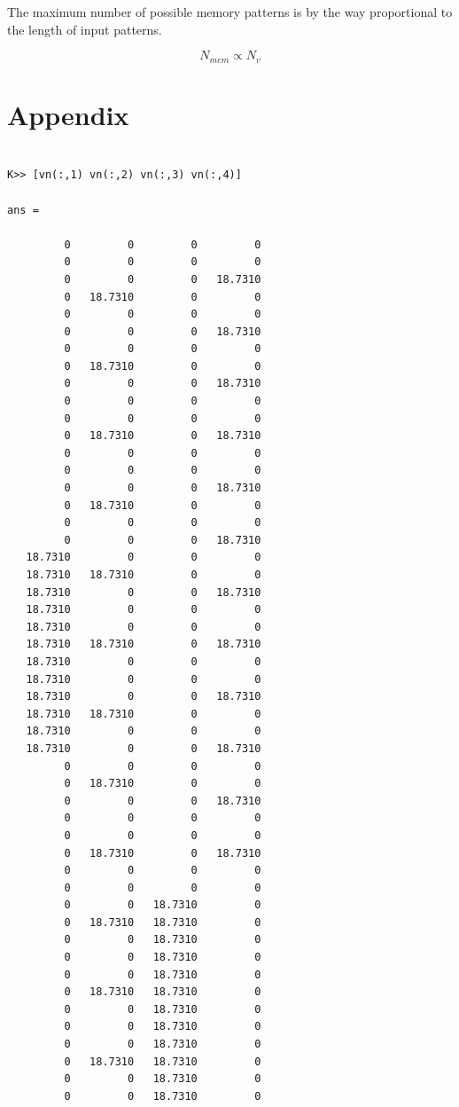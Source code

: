 \documentclass{article}
\begin{document}
The maximum number of possible memory patterns is by the way proportional to the length of input patterns.

\begin{equation}
 N_{mem} \propto N_{v}
\end{equation}


\section{Appendix}

	\begin{verbatim}
 
K>> [vn(:,1) vn(:,2) vn(:,3) vn(:,4)]

ans =

         0         0         0         0
         0         0         0         0
         0         0         0   18.7310
         0   18.7310         0         0
         0         0         0         0
         0         0         0   18.7310
         0         0         0         0
         0   18.7310         0         0
         0         0         0   18.7310
         0         0         0         0
         0         0         0         0
         0   18.7310         0   18.7310
         0         0         0         0
         0         0         0         0
         0         0         0   18.7310
         0   18.7310         0         0
         0         0         0         0
         0         0         0   18.7310
   18.7310         0         0         0
   18.7310   18.7310         0         0
   18.7310         0         0   18.7310
   18.7310         0         0         0
   18.7310         0         0         0
   18.7310   18.7310         0   18.7310
   18.7310         0         0         0
   18.7310         0         0         0
   18.7310         0         0   18.7310
   18.7310   18.7310         0         0
   18.7310         0         0         0
   18.7310         0         0   18.7310
         0         0         0         0
         0   18.7310         0         0
         0         0         0   18.7310
         0         0         0         0
         0         0         0         0
         0   18.7310         0   18.7310
         0         0         0         0
         0         0         0         0
         0         0   18.7310         0
         0   18.7310   18.7310         0
         0         0   18.7310         0
         0         0   18.7310         0
         0         0   18.7310         0
         0   18.7310   18.7310         0
         0         0   18.7310         0
         0         0   18.7310         0
         0         0   18.7310         0
         0   18.7310   18.7310         0
         0         0   18.7310         0
         0         0   18.7310         0

	\end{verbatim}
\end{document}
